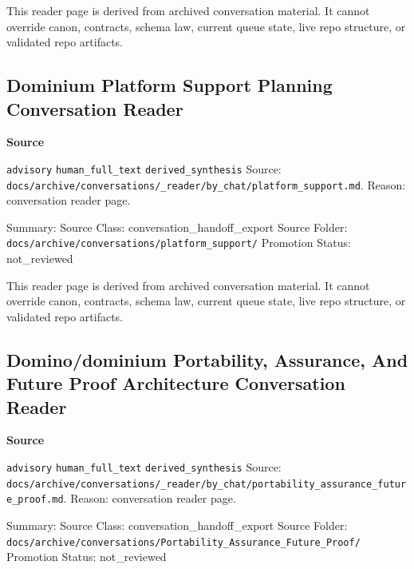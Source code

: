 \documentclass[9pt,a4paper,openany]{book}
\newcommand{\vonecallout}[3]{\par\medskip\noindent\begingroup\setlength{\fboxsep}{7pt}\colorbox{DomCalloutBg}{\parbox{0.94\linewidth}{\textbf{\textcolor{#1}{#2}}\par #3}}\endgroup\par\medskip}
\begin{document}
This reader page is derived from archived conversation material.\allowbreak{} It cannot override canon, contracts, schema law, current queue state, live repo structure, or validated repo artifacts.\allowbreak{}



\subsection{Dominium Platform Support Planning Conversation Reader}

\vonecallout{DomSlate}{Source}{\texttt{advisory} \texttt{human\_\allowbreak{}full\_\allowbreak{}text} \texttt{derived\_\allowbreak{}synthesis} Source: \texttt{docs/\allowbreak{}archive/\allowbreak{}conversations/\allowbreak{}\_\allowbreak{}reader/\allowbreak{}by\_\allowbreak{}chat/\allowbreak{}platform\_\allowbreak{}support.\allowbreak{}md}.\allowbreak{} Reason: conversation reader page.\allowbreak{}}

Summary: Source Class: conversation\_\allowbreak{}handoff\_\allowbreak{}export Source Folder: \texttt{docs/\allowbreak{}archive/\allowbreak{}conversations/\allowbreak{}platform\_\allowbreak{}support/\allowbreak{}} Promotion Status: not\_\allowbreak{}reviewed


This reader page is derived from archived conversation material.\allowbreak{} It cannot override canon, contracts, schema law, current queue state, live repo structure, or validated repo artifacts.\allowbreak{}



\subsection{Domino/dominium Portability, Assurance, And Future Proof Architecture Conversation Reader}

\vonecallout{DomSlate}{Source}{\texttt{advisory} \texttt{human\_\allowbreak{}full\_\allowbreak{}text} \texttt{derived\_\allowbreak{}synthesis} Source: \texttt{docs/\allowbreak{}archive/\allowbreak{}conversations/\allowbreak{}\_\allowbreak{}reader/\allowbreak{}by\_\allowbreak{}chat/\allowbreak{}portability\_\allowbreak{}assurance\_\allowbreak{}future\_\allowbreak{}proof.\allowbreak{}md}.\allowbreak{} Reason: conversation reader page.\allowbreak{}}

Summary: Source Class: conversation\_\allowbreak{}handoff\_\allowbreak{}export Source Folder: \texttt{docs/\allowbreak{}archive/\allowbreak{}conversations/\allowbreak{}Portability\_\allowbreak{}Assurance\_\allowbreak{}Future\_\allowbreak{}Proof/\allowbreak{}} Promotion Status: not\_\allowbreak{}reviewed
\end{document}
